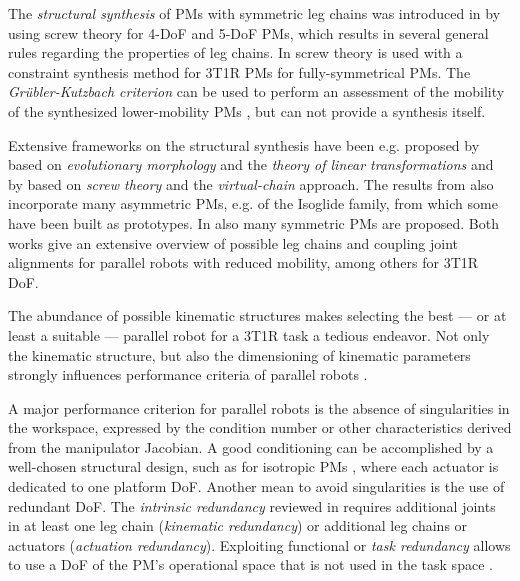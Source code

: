 \documentclass[
	graybox,
	vecphys] %
	{svmult}
\begin{document}
The \emph{structural synthesis} of PMs with symmetric leg chains was introduced in  \cite{FangTsa2002} by using screw theory for 4-DoF and 5-DoF PMs, which results in several general rules regarding the properties of leg chains.
In \cite{HuangLi2003} screw theory is used with a constraint synthesis method for 3T1R PMs for fully-symmetrical PMs.
The \emph{Grübler-Kutzbach criterion} can be used to perform an assessment of the mobility of the synthesized lower-mobility PMs \cite{HuangLi2003,Gogu2008}, but can not provide a synthesis itself.

Extensive frameworks on the structural synthesis have been e.g. proposed by 
\cite{Gogu2008} based on \emph{evolutionary morphology} and the \emph{theory of linear transformations} and by \cite{KongGos2007} based on \emph{screw theory} and the \emph{virtual-chain} approach.
%
The results from \cite{Gogu2008} also incorporate many asymmetric PMs, e.g. of the Isoglide family, from which some have been built as prototypes.
In \cite{KongGos2007} also many symmetric PMs are proposed.
Both works give an extensive overview of possible leg chains and coupling joint alignments for parallel robots with reduced mobility, among others for 3T1R DoF.

The abundance of possible kinematic structures makes selecting the best --- or at least a suitable --- parallel robot for a 3T1R task a tedious endeavor.
Not only the kinematic structure, but also the dimensioning of kinematic parameters strongly influences performance criteria of parallel robots \cite{Merlet2006}.

A major performance criterion for parallel robots is the absence of singularities in the workspace, expressed by the condition number or other characteristics derived from the manipulator Jacobian.
A good conditioning can be accomplished by a well-chosen structural design, such as for isotropic PMs \cite{Carricato2005,Gogu2008}, where each actuator is dedicated to one platform DoF.
Another mean to avoid singularities is the use of redundant DoF.
The \emph{intrinsic redundancy} reviewed in \cite{GosselinSch2018} requires additional joints in at least one leg chain (\emph{kinematic redundancy}) or additional leg chains or actuators (\emph{actuation redundancy}).
Exploiting functional or \emph{task redundancy} allows to use a DoF of the PM's operational space that is not used in the task space \cite{CorinaldiAngCal2016}.
\end{document}

